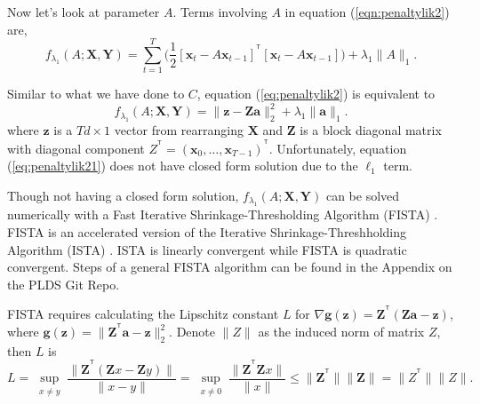 \documentclass[fleqn,12pt]{article}
\let\oldref\ref
\renewcommand{\ref}[1]{(\oldref{#1})}
\newcommand{\T}{^{\ensuremath{\mathsf{T}}}}           %
\providecommand{\mb}[1]{\boldsymbol{#1}}
\newcommand{\bx}{\mb{x}}
\newcommand{\bX}{\mb{X}}
\newcommand{\bY}{\mb{Y}}
\begin{document}
Now let's look at parameter $A$. Terms involving $A$ in equation \ref{eqn:penaltylik2} are,
\begin{equation}\label{eq:penaltylik2}
f_{\lambda_1}(A;\bX,\bY) = \sum\limits_{t=1}^{T}\big(\frac{1}{2}[\bx_t-A\bx_{t-1}]^{\T}[\bx_t-A\bx_{t-1}]\big)+\lambda_1 \|A\|_1.
\end{equation}

Similar to what we have done to $C$, equation \ref{eq:penaltylik2} is equivalent to
\begin{equation}\label{eq:penaltylik21}
f_{\lambda_1}(A;\bX,\bY) =  \|\mathbf{z}  - \mathbf{Za}\|_2^2 + \lambda_1\|\mathbf{a}\|_1.
\end{equation}
where $\mathbf{z}$ is a $Td \times 1$ vector from rearranging $\bX$ and $\mathbf{Z}$ is a block diagonal matrix with diagonal component $Z^{\T} =(\bx_0,\ldots,\bx_{T-1})^{\T}$. Unfortunately, equation \ref{eq:penaltylik21} does not have closed form solution due to the $\ell_1$ term.


Though not having a closed form solution, $f_{\lambda_1}(A;\bX,\bY)$ can be solved numerically with a Fast Iterative Shrinkage-Thresholding Algorithm (FISTA) \citep{beck2009fast}. FISTA is an accelerated version of the Iterative Shrinkage-Threshholding Algorithm (ISTA) \citep{daubechies2004iterative}. ISTA is linearly convergent while FISTA is quadratic convergent. Steps of a general FISTA algorithm can be found in the Appendix on the PLDS Git Repo.

FISTA requires calculating the Lipschitz constant $L$ for $\nabla\mathbf{g(z)}=\mathbf{Z}^{\T}(\mathbf{Z}\mathbf{a} -\mathbf{z})$, where $\mathbf{g}(\mathbf{z})=\|\mathbf{Z}^{\T}\mathbf{a} -\mathbf{z}\|_2^2$. Denote $\|Z\|$ as the induced norm of matrix $Z$, then $L$ is
\[
L = \sup_{\substack{x\neq y}}\frac{\|\mathbf{Z}^{\T}(\mathbf{Z}x- \mathbf{Z}y)\|}{\|x-y\|}=\sup_{\substack{x\neq 0}}\frac{\|\mathbf{Z}^{\T}\mathbf{Z}x\|}{\|x\|}\leq\|\mathbf{Z}^{\T}\|\|\mathbf{Z}\| = \|Z^{\T}\|\|Z\|.
\]
\end{document}
